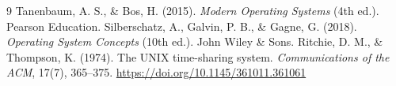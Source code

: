 \documentclass[12pt,letterpaper]{article}
\begin{document}
\bigskip
\bigskip

\begin{thebibliography}{9}
  Tanenbaum, A. S., \& Bos, H. (2015). \textit{Modern Operating Systems} (4th ed.). Pearson Education.
  Silberschatz, A., Galvin, P. B., \& Gagne, G. (2018). \textit{Operating System Concepts} (10th ed.). John Wiley \& Sons.
  Ritchie, D. M., \& Thompson, K. (1974). The UNIX time-sharing system. \textit{Communications of the ACM}, 17(7), 365--375. \url{https://doi.org/10.1145/361011.361061}
\end{thebibliography}
\end{document}
